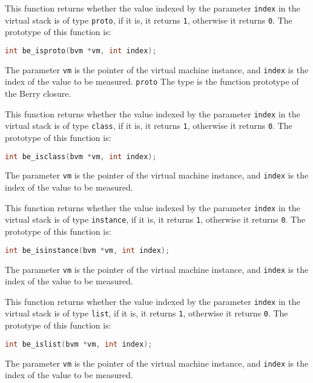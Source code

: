 
This function returns whether the value indexed by the parameter \texttt{index} in the virtual stack is of type \texttt{proto}, if it is, it returns \texttt{1}, otherwise it returns \texttt{0}. The prototype of this function is:
\begin{lstlisting}[language=c, style=berry, numbers=none]
int be_isproto(bvm *vm, int index);
\end{lstlisting}
The parameter \texttt{vm} is the pointer of the virtual machine instance, and \texttt{index} is the index of the value to be measured. \texttt{proto} The type is the function prototype of the Berry closure.


This function returns whether the value indexed by the parameter \texttt{index} in the virtual stack is of type \texttt{class}, if it is, it returns \texttt{1}, otherwise it returns \texttt{0}. The prototype of this function is:
\begin{lstlisting}[language=c, style=berry, numbers=none]
int be_isclass(bvm *vm, int index);
\end{lstlisting}
The parameter \texttt{vm} is the pointer of the virtual machine instance, and \texttt{index} is the index of the value to be measured.


This function returns whether the value indexed by the parameter \texttt{index} in the virtual stack is of type \texttt{instance}, if it is, it returns \texttt{1}, otherwise it returns \texttt{0}. The prototype of this function is:
\begin{lstlisting}[language=c, style=berry, numbers=none]
int be_isinstance(bvm *vm, int index);
\end{lstlisting}
The parameter \texttt{vm} is the pointer of the virtual machine instance, and \texttt{index} is the index of the value to be measured.

This function returns whether the value indexed by the parameter \texttt{index} in the virtual stack is of type \texttt{list}, if it is, it returns \texttt{1}, otherwise it returns \texttt{0}. The prototype of this function is:
\begin{lstlisting}[language=c, style=berry, numbers=none]
int be_islist(bvm *vm, int index);
\end{lstlisting}
The parameter \texttt{vm} is the pointer of the virtual machine instance, and \texttt{index} is the index of the value to be measured.

